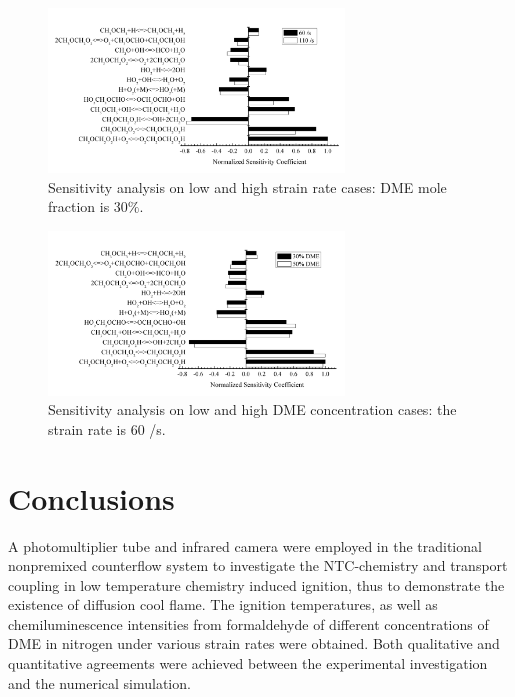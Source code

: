 \documentclass[review,3p,times]{elsarticleUS}
\begin{document}
\begin{figure}[ht]
  \centering
  \scriptsize
  \vspace{-0.1in}
  \includegraphics[width=0.7\textwidth]{Sen_SR.png}
  \normalsize
  \vspace{-0.1in}
  \caption{Sensitivity analysis on low and high strain rate cases: DME mole fraction is $30\%$.}
  \label{fig:Sen_SR}
\end{figure}


\begin{figure}[ht]
  \centering
  \scriptsize
  \vspace{-0.1in}
  \includegraphics[width=0.7\textwidth]{Sen_Con.png}
  \normalsize
  \vspace{-0.1in}
  \caption{Sensitivity analysis on low and high DME concentration cases: the strain rate is  $60$ /s.}
  \label{fig:Sen_Con}
\end{figure}



\section{Conclusions}           

A photomultiplier tube and infrared camera were employed in the traditional nonpremixed counterflow system to investigate the NTC-chemistry and transport coupling in low temperature chemistry induced ignition, thus to demonstrate the existence of diffusion cool flame. The ignition temperatures, as well as chemiluminescence intensities from formaldehyde of different concentrations of DME in nitrogen under various strain rates were obtained. Both qualitative and quantitative agreements were achieved between the experimental investigation and the numerical simulation. 
\end{document}
